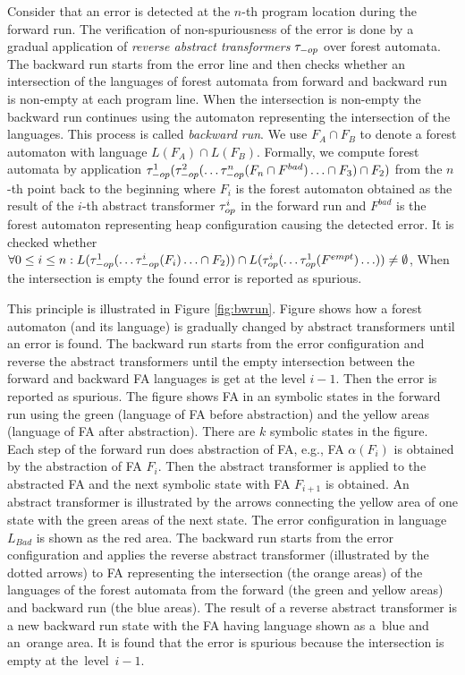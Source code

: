 Consider that an error is detected at the $n$-th program location
during the forward run.
The verification of non-spuriousness of the error is done by a gradual application of
\emph{reverse abstract transformers} $\tau_{-op}$ over forest automata.
The backward run starts from the error line and
then checks whether an intersection of
the languages of forest automata from forward and backward run is non-empty
at each program line.
When the intersection is non-empty the backward run continues using the automaton
representing the intersection of the languages.
This process is called \emph{backward run}.
We use $F_A \cap F_B$ to denote a forest automaton with language $L(F_A) \cap L(F_B)$.
Formally, we compute forest automata by application
$\tau_{-op}^1(\tau_{-op}^{2}(\ldots \tau_{-op}^{n}(F_{n} \cap F^{bad}) \ldots \cap F_{3}) \cap F_{2})$
from the $n$-th point back to the beginning
where $F_i$ is the forest automaton obtained as the result of 
the $i$-th abstract transformer $\tau_{op}^{i}$ in the forward run
and $F^{bad}$ is the forest automaton representing heap configuration causing the detected error.
It is checked whether $\forall 0 \leq i \leq n: L(\tau_{-op}^1(\ldots \tau_{-op}^{i}(F_{i}) \ldots \cap F_2)) \cap
L(\tau_{op}^i(\ldots \tau_{op}^{1}(F^{empt}) \ldots)) \neq \emptyset$,
When the intersection is empty the found error is reported as spurious.

This principle is illustrated in Figure \ref{fig:bwrun}.
Figure shows how a forest automaton (and its language) is gradually changed
by abstract transformers until an error is found.
The backward run starts from the error configuration and reverse the abstract transformers
until the empty intersection between the forward and backward FA languages
is get at the level $i-1$.
Then the error is reported as spurious.
The figure shows FA in an symbolic states in the forward run using the green (language of
FA before abstraction) and the yellow areas (language of FA after abstraction).
There are $k$ symbolic states in the figure.
Each step of the forward run does abstraction of FA,
e.g., FA $\alpha(F_{i})$ is obtained by the abstraction of FA $F_i$.
Then the abstract transformer is applied to the abstracted FA
and the next symbolic state with FA $F_{i+1}$ is obtained.
An abstract transformer is illustrated by the arrows connecting
the yellow area of one state with the green areas of the next state.
The error configuration in language $L_{\mathit{Bad}}$ is shown as the red area.
The backward run starts from the error configuration and applies the reverse abstract transformer
(illustrated by the dotted arrows) to FA representing the intersection
(the orange areas) of the languages of the forest automata
from the forward (the green and yellow areas) and backward run (the blue areas).
The result of a reverse abstract transformer is a new backward run state
with the FA having language shown as a~blue and an~orange area.
It is found that the error is spurious because the intersection
is empty at the~level~$i-1$.


